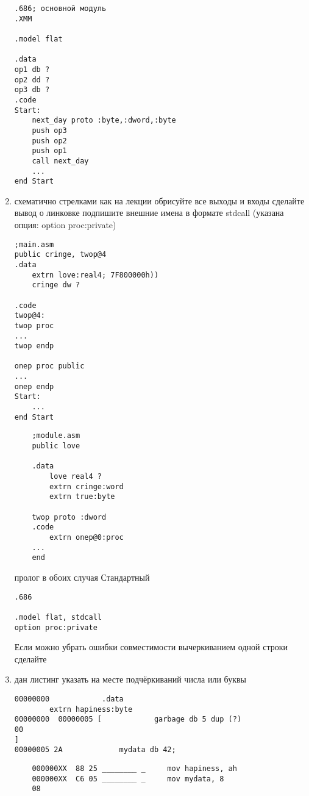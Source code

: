 \documentclass[a4paper,10pt]{article}
\begin{document}
\begin{enumerate}
\begin{verbatim}
.686; основной модуль
.XMM

.model flat

.data 
op1 db ?
op2 dd ?
op3 db ?
.code
Start:
    next_day proto :byte,:dword,:byte
    push op3
    push op2
    push op1
    call next_day
    ...
end Start
\end{verbatim}
    \item схематично стрелками как на лекции обрисуйте все выходы и входы сделайте вывод о линковке подпишите внешние имена в формате stdcall (указана опция: option proc:private)
\begin{multicols}{2}
\begin{verbatim}
;main.asm
public cringe, twop@4
.data
    extrn love:real4; 7F800000h))
    cringe dw ?
    
.code
twop@4:
twop proc
...
twop endp

onep proc public
...
onep endp
Start:
    ...
end Start
\end{verbatim}
\columnbreak
\begin{verbatim}
    ;module.asm
    public love
    
    .data
        love real4 ?
        extrn cringe:word
        extrn true:byte
        
    twop proto :dword
    .code
        extrn onep@0:proc
    ...
    end
\end{verbatim}
\end{multicols}
пролог в обоих случая Стандартный
\begin{verbatim}
.686

.model flat, stdcall
option proc:private
\end{verbatim}
    Если можно убрать ошибки совместимости вычеркиванием одной строки сделайте
\item дан листинг указать на месте подчёркиваний числа или буквы
\begin{multicols}{2}
\begin{verbatim}
00000000			.data
        extrn hapiness:byte
00000000  00000005 [		    garbage db 5 dup (?)
00
]
00000005 2A			    mydata db 42; 
\end{verbatim}
\columnbreak
\begin{verbatim}
    000000XX  88 25 ________ _	   mov hapiness, ah
    000000XX  C6 05 ________ _	   mov mydata, 8
    08
\end{verbatim}
\end{multicols}
\end{enumerate}
\end{document}
